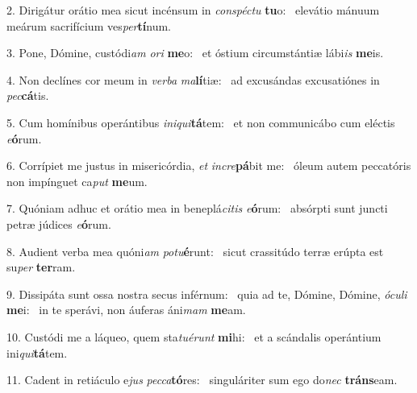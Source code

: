 2. Dirigátur orátio mea sicut incénsum in \textit{con}\textit{spéc}\textit{tu} \textbf{tu}o: \ast\  elevátio mánuum meárum sacrifícium ves\textit{per}\textbf{tí}num.\

3. Pone, Dómine, custódi\textit{am} \textit{o}\textit{ri} \textbf{me}o: \ast\  et óstium circumstántiæ lábi\textit{is} \textbf{me}is.\

4. Non declínes cor meum in \textit{ver}\textit{ba} \textit{ma}\textbf{lí}tiæ: \ast\  ad excusándas excusatiónes in \textit{pec}\textbf{cá}tis.\

5. Cum homínibus operántibus \textit{in}\textit{i}\textit{qui}\textbf{tá}tem: \ast\  et non communicábo cum eléctis \textit{e}\textbf{ó}rum.\

6. Corrípiet me justus in misericórdia, \textit{et} \textit{in}\textit{cre}\textbf{pá}bit me: \ast\  óleum autem peccatóris non impínguet ca\textit{put} \textbf{me}um.\

7. Quóniam adhuc et orátio mea in beneplá\textit{ci}\textit{tis} \textit{e}\textbf{ó}rum: \ast\  absórpti sunt juncti petræ júdices \textit{e}\textbf{ó}rum.\

8. Audient verba mea quóni\textit{am} \textit{pot}\textit{u}\textbf{é}runt: \ast\  sicut crassitúdo terræ erúpta est su\textit{per} \textbf{ter}ram.\

9. Dissipáta sunt ossa nostra secus inférnum: \dag\  quia ad te, Dómine, Dómine, \textit{ó}\textit{cu}\textit{li} \textbf{me}i: \ast\  in te sperávi, non áuferas áni\textit{mam} \textbf{me}am.\

10. Custódi me a láqueo, quem sta\textit{tu}\textit{é}\textit{runt} \textbf{mi}hi: \ast\  et a scándalis operántium ini\textit{qui}\textbf{tá}tem.\

11. Cadent in retiáculo e\textit{jus} \textit{pec}\textit{ca}\textbf{tó}res: \ast\  singuláriter sum ego do\textit{nec} \textbf{tráns}eam.\

